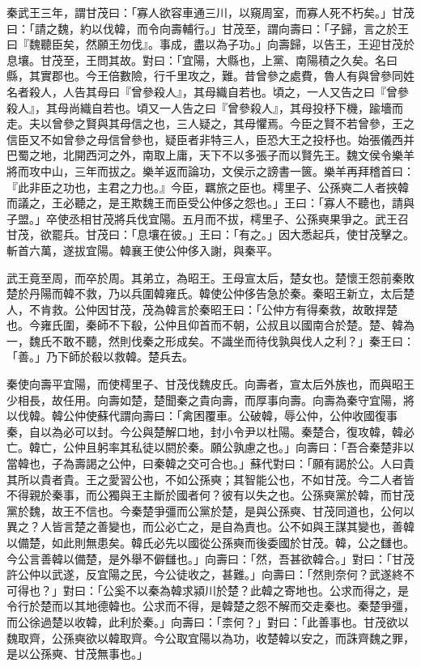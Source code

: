 \begin{pinyinscope}
秦武王三年，謂甘茂曰：「寡人欲容車通三川，以窺周室，而寡人死不朽矣。」甘茂曰：「請之魏，約以伐韓，而令向壽輔行。」甘茂至，謂向壽曰：「子歸，言之於王曰『魏聽臣矣，然願王勿伐』。事成，盡以為子功。」向壽歸，以告王，王迎甘茂於息壤。甘茂至，王問其故。對曰：「宜陽，大縣也，上黨、南陽積之久矣。名曰縣，其實郡也。今王倍數險，行千里攻之，難。昔曾參之處費，魯人有與曾參同姓名者殺人，人告其母曰『曾參殺人』，其母織自若也。頃之，一人又告之曰『曾參殺人』，其母尚織自若也。頃又一人告之曰『曾參殺人』，其母投杼下機，踰墻而走。夫以曾參之賢與其母信之也，三人疑之，其母懼焉。今臣之賢不若曾參，王之信臣又不如曾參之母信曾參也，疑臣者非特三人，臣恐大王之投杼也。始張儀西并巴蜀之地，北開西河之外，南取上庸，天下不以多張子而以賢先王。魏文侯令樂羊將而攻中山，三年而拔之。樂羊返而論功，文侯示之謗書一篋。樂羊再拜稽首曰：『此非臣之功也，主君之力也。』今臣，羈旅之臣也。樗里子、公孫奭二人者挾韓而議之，王必聽之，是王欺魏王而臣受公仲侈之怨也。」王曰：「寡人不聽也，請與子盟。」卒使丞相甘茂將兵伐宜陽。五月而不拔，樗里子、公孫奭果爭之。武王召甘茂，欲罷兵。甘茂曰：「息壤在彼。」王曰：「有之。」因大悉起兵，使甘茂擊之。斬首六萬，遂拔宜陽。韓襄王使公仲侈入謝，與秦平。

武王竟至周，而卒於周。其弟立，為昭王。王母宣太后，楚女也。楚懷王怨前秦敗楚於丹陽而韓不救，乃以兵圍韓雍氏。韓使公仲侈告急於秦。秦昭王新立，太后楚人，不肯救。公仲因甘茂，茂為韓言於秦昭王曰：「公仲方有得秦救，故敢捍楚也。今雍氏圍，秦師不下殽，公仲且仰首而不朝，公叔且以國南合於楚。楚、韓為一，魏氏不敢不聽，然則伐秦之形成矣。不識坐而待伐孰與伐人之利？」秦王曰：「善。」乃下師於殽以救韓。楚兵去。

秦使向壽平宜陽，而使樗里子、甘茂伐魏皮氏。向壽者，宣太后外族也，而與昭王少相長，故任用。向壽如楚，楚聞秦之貴向壽，而厚事向壽。向壽為秦守宜陽，將以伐韓。韓公仲使蘇代謂向壽曰：「禽困覆車。公破韓，辱公仲，公仲收國復事秦，自以為必可以封。今公與楚解口地，封小令尹以杜陽。秦楚合，復攻韓，韓必亡。韓亡，公仲且躬率其私徒以閼於秦。願公孰慮之也。」向壽曰：「吾合秦楚非以當韓也，子為壽謁之公仲，曰秦韓之交可合也。」蘇代對曰：「願有謁於公。人曰貴其所以貴者貴。王之愛習公也，不如公孫奭；其智能公也，不如甘茂。今二人者皆不得親於秦事，而公獨與王主斷於國者何？彼有以失之也。公孫奭黨於韓，而甘茂黨於魏，故王不信也。今秦楚爭彊而公黨於楚，是與公孫奭、甘茂同道也，公何以異之？人皆言楚之善變也，而公必亡之，是自為責也。公不如與王謀其變也，善韓以備楚，如此則無患矣。韓氏必先以國從公孫奭而後委國於甘茂。韓，公之讎也。今公言善韓以備楚，是外舉不僻讎也。」向壽曰：「然，吾甚欲韓合。」對曰：「甘茂許公仲以武遂，反宜陽之民，今公徒收之，甚難。」向壽曰：「然則奈何？武遂終不可得也？」對曰：「公奚不以秦為韓求潁川於楚？此韓之寄地也。公求而得之，是令行於楚而以其地德韓也。公求而不得，是韓楚之怨不解而交走秦也。秦楚爭彊，而公徐過楚以收韓，此利於秦。」向壽曰：「柰何？」對曰：「此善事也。甘茂欲以魏取齊，公孫奭欲以韓取齊。今公取宜陽以為功，收楚韓以安之，而誅齊魏之罪，是以公孫奭、甘茂無事也。」


\end{pinyinscope}
